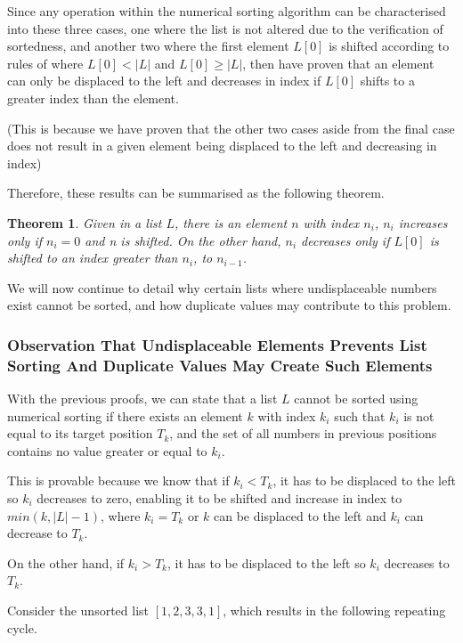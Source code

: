 \documentclass[12pt]{article}
\newtheorem{theorem}{Theorem}[section]
\begin{document}
Since any operation within the numerical sorting algorithm can be characterised into these three cases, one where the list is not altered due to the verification of sortedness, and another two where the first element $L[0]$ is shifted according to rules of where $L[0]<|L|$ and $L[0] \geq |L|$, then have proven that an element can only be displaced to the left and decreases in index if $L[0]$ shifts to a greater index than the element.

(This is because we have proven that the other two cases aside from the final case does not result in a given element being displaced to the left and decreasing in index)

Therefore, these results can be summarised as the following theorem.

\begin{theorem}
Given in a list $L$, there is an element $n$ with index $n_i$, $n_i$ increases only if $n_i=0$ and n is shifted. On the other hand, $n_i$ decreases only if $L[0]$ is shifted to an index greater than $n_i$, to $n_{i-1}$.
\end{theorem}

We will now continue to detail why certain lists where undisplaceable numbers exist cannot be sorted, and how duplicate values may contribute to this problem.

\subsubsection{Observation That Undisplaceable Elements Prevents List Sorting And Duplicate Values May Create Such Elements}

With the previous proofs, we can state that a list $L$ cannot be sorted using numerical sorting if there exists an element $k$ with index $k_i$ such that $k_i$ is not equal to its target position $T_k$, and the set of all numbers in previous positions contains no value greater or equal to $k_i$.

This is provable because we know that if $k_i<T_k$, it has to be displaced to the left so $k_i$ decreases to zero, enabling it to be shifted and increase in index to $min(k,|L|-1)$, where $k_i=T_k$ or $k$ can be displaced to the left and $k_i$ can decrease to $T_k$.

On the other hand, if $k_i>T_k$, it has to be displaced to the left so $k_i$ decreases to $T_k$.

Consider the unsorted list $[1,2,3,3,1]$, which results in the following repeating cycle.
\end{document}
